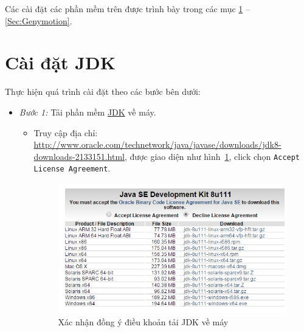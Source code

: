 \documentclass[13pt,a4paper]{extreport}
\begin{document}
	Các cài đặt các phần mềm trên được trình bày trong các mục \ref{Sec:JDK} -- \ref{Sec:Genymotion}.

\section{Cài đặt JDK}\label{Sec:JDK}
	Thực hiện quá trình cài đặt theo các bước bên dưới:
	\begin{itemize}
		\item \textit{Bước 1:} Tải phần mềm \href{http://www.oracle.com/technetwork/java/javase/downloads/jdk8-downloads-2133151.html}{JDK} về máy.
			\begin{itemize}
				\item Truy cập địa chỉ: \url{http://www.oracle.com/technetwork/java/javase/downloads/jdk8-downloads-2133151.html}, được giao diện như hình~\ref{Fig:setup-JDK-1}, click chọn \verb|Accept License Agreement|.				
					\begin{figure}[!h]
						\vspace{-.5cm}
						\begin{center}
							\includegraphics[scale=1]{setup-JDK-1.png}
						\end{center}
						\vspace{-.5cm}
						\caption{Xác nhận đồng ý điều khoản tải JDK về máy}
						\label{Fig:setup-JDK-1}
						\vspace{-.5cm}
					\end{figure}
				

\end{itemize}
\end{itemize}
\end{document}
